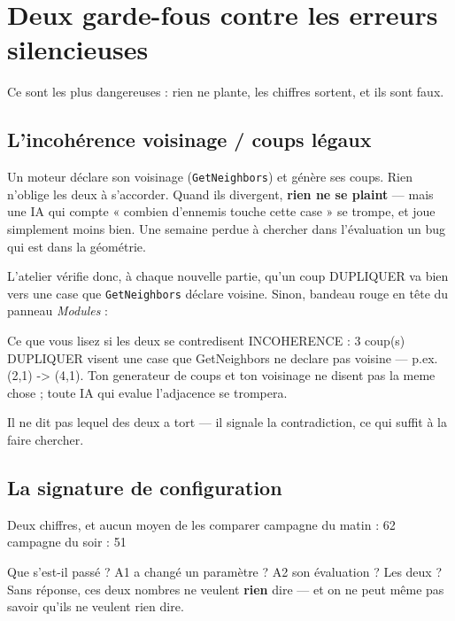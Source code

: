 \section{Deux garde-fous contre les erreurs silencieuses}

Ce sont les plus dangereuses : rien ne plante, les chiffres sortent, et ils sont
faux.

\subsection{L'incohérence voisinage / coups légaux}

Un moteur déclare son voisinage (\texttt{GetNeighbors}) et génère ses coups. Rien
n'oblige les deux à s'accorder. Quand ils divergent, \textbf{rien ne se plaint} —
mais une IA qui compte « combien d'ennemis touche cette case » se trompe, et joue
simplement moins bien. Une semaine perdue à chercher dans l'évaluation un bug qui
est dans la géométrie.

L'atelier vérifie donc, à chaque nouvelle partie, qu'un coup DUPLIQUER va bien
vers une case que \texttt{GetNeighbors} déclare voisine. Sinon, bandeau rouge en
tête du panneau \emph{Modules} :

\begin{nkcode}{Ce que vous lisez si les deux se contredisent}
INCOHERENCE : 3 coup(s) DUPLIQUER visent une case que GetNeighbors ne
declare pas voisine — p.ex. (2,1) -> (4,1). Ton generateur de coups et ton
voisinage ne disent pas la meme chose ; toute IA qui evalue l'adjacence se
trompera.
\end{nkcode}

Il ne dit pas lequel des deux a tort — il signale la contradiction, ce qui suffit
à la faire chercher.

\subsection{La signature de configuration}

\begin{nkcode}{Deux chiffres, et aucun moyen de les comparer}
campagne du matin  : 62 %
campagne du soir   : 51 %
\end{nkcode}

Que s'est-il passé ? A1 a changé un paramètre ? A2 son évaluation ? Les deux ?
Sans réponse, ces deux nombres ne veulent \textbf{rien} dire — et on ne peut même
pas savoir qu'ils ne veulent rien dire.

